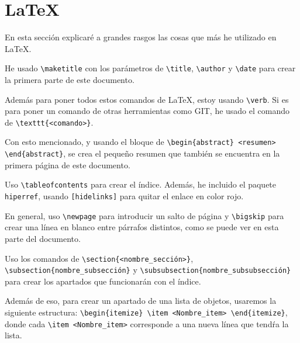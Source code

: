 \documentclass[a4,12pt]{article}
\begin{document}
\newpage

\section{\LaTeX}

En esta sección explicaré a grandes rasgos las cosas que más he utilizado en \LaTeX.

\bigskip
He usado \verb+\maketitle+ con los parámetros de \verb+\title+, \verb+\author+ y \verb+\date+ para crear la primera parte de este documento.

\bigskip
Además para poner todos estos comandos de \LaTeX, estoy usando \verb+\verb+. Si es para poner un comando de otras herramientas como GIT, he usado el comando de \verb+\texttt{<comando>}+.

\bigskip
Con esto mencionado, y usando el bloque de \verb+\begin{abstract} <resumen> \end{abstract}+, se crea el pequeño resumen que también se encuentra en la primera página de este documento.

\bigskip
Uso \verb+\tableofcontents+ para crear el índice. Además, he incluido el paquete \texttt{hiperref}, usando \verb+[hidelinks]+ para quitar el enlace en color rojo.

\bigskip
En general, uso \verb+\newpage+ para introducir un salto de página y \verb+\bigskip+ para crear una línea en blanco entre párrafos distintos, como se puede ver en esta parte del documento.

\bigskip
Uso los comandos de \verb+\section{<nombre_sección>}+, \verb+\subsection{nombre_subsección}+ y \verb+\subsubsection{nombre_subsubsección}+ para crear los apartados que funcionarán con el índice.

\bigskip
Además de eso, para crear un apartado de una lista de objetos, usaremos la siguiente estructura:
\verb+\begin{itemize} \item <Nombre_item> \end{itemize}+, donde cada \verb+\item <Nombre_item>+ corresponde a una nueva línea que tendŕa la lista. 
\end{document}
